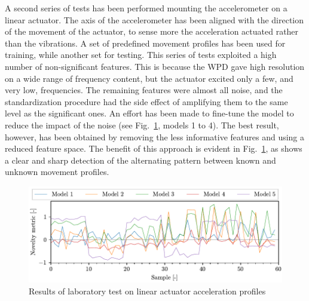 A second series of tests has been performed mounting the accelerometer on a linear actuator. The axis of the accelerometer has been aligned with the direction of the movement of the actuator, to sense more the acceleration actuated rather than the vibrations. A set of predefined movement profiles has been used for training, while another set for testing. This series of tests exploited a high number of non-significant features. This is because the WPD gave high resolution on a wide range of frequency content, but the actuator excited only a few, and very low, frequencies. The remaining features were almost all noise, and the standardization procedure had the side effect of amplifying them to the same level as the significant ones. An effort has been made to fine-tune the model to reduce the impact of the noise (see Fig.~\ref{fig:linear}, models 1 to 4). The best result, however, has been obtained by removing the less informative features and using a reduced feature space. The benefit of this approach is evident in Fig.~\ref{fig:linear}, as  shows a clear and sharp detection of the alternating pattern between known and unknown movement profiles.


\begin{figure}
    \includegraphics[width=\linewidth]{images/linear.pdf}
    \caption{Results of laboratory test on linear actuator acceleration profiles}
    \label{fig:linear}
\end{figure}